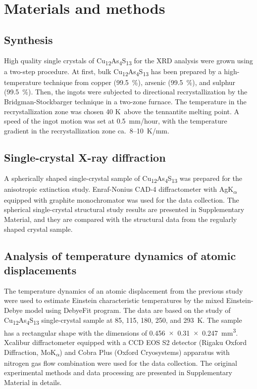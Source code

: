 \documentclass[preprint,review,12pt]{elsarticle}
\begin{document}
\section{Materials and methods}\label{sec:level1}
\subsection{Synthesis}\label{sec:level2}

High quality single crystals of Cu\textsubscript{12}As\textsubscript{4}S\textsubscript{13} for the XRD analysis were grown using a two-step procedure. At first, bulk Cu\textsubscript{12}As\textsubscript{4}S\textsubscript{13} has been prepared by a high-temperature technique from copper (99.5~\%), arsenic (99.5~\%), and sulphur (99.5~\%).
Then, the ingots were subjected to directional recrystallization by the Bridgman-Stockbarger technique in a two-zone furnace.
The temperature in the recrystallization zone was chosen 40 K~above the tennantite melting point. A speed of the ingot motion was set at 0.5~mm/hour, with the temperature gradient in the recrystallization zone ca.~8--10~K/mm.

\subsection{Single-crystal X-ray diffraction}\label{sec:level2}
A spherically shaped single-crystal sample of Cu\textsubscript{12}As\textsubscript{4}S\textsubscript{13}  was prepared for the anisotropic extinction study\cite{Becker1975}.
Enraf-Nonius CAD-4 diffractometer with AgK\textsubscript{$\alpha$} equipped with graphite monochromator was used for the data collection.
The spherical single-crystal structural study results are presented in Supplementary Material, and they are compared with the structural data from the regularly shaped crystal sample\cite{yaroslavzev2019}.

\subsection{Analysis of temperature dynamics of atomic displacements}\label{sec:level2}
The temperature dynamics of an atomic displacement from the previous study\cite{yaroslavzev2019} were used to estimate Einstein characteristic temperatures by the mixed Einstein-Debye model using DebyeFit program\cite{Dudka2019}.
The data are based on the study of  Cu\textsubscript{12}As\textsubscript{4}S\textsubscript{13} single-crystal sample at 85, 115, 180, 250, and 293~K.
The sample has a rectangular shape with the dimensions of 0.456~$\times$~0.31~$\times$~0.247~mm\textsuperscript{3}.
Xcalibur diffractometer equipped with a CCD EOS S2 detector (Rigaku Oxford Diffraction, MoK\textsubscript{$\alpha$}) and Cobra Plus (Oxford Cryosystems) apparatus with nitrogen gas flow combination were used for the data collection.
The original experimental methods and data processing are presented in Supplementary Material in details.
\end{document}

